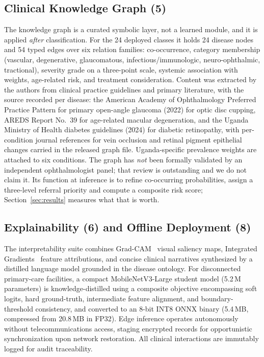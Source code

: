 \documentclass[11pt]{IEEEtran}
\begin{document}
\subsection{Clinical Knowledge Graph (5)}
\label{sec:kg}
The knowledge graph is a curated symbolic layer, not a learned module, and it is applied
\emph{after} classification. For the 24 deployed classes it holds 24 disease nodes and 54 typed
edges over six relation families: co-occurrence, category membership (vascular, degenerative,
glaucomatous, infectious/immunologic, neuro-ophthalmic, tractional), severity grade on a
three-point scale, systemic association with weights, age-related risk, and treatment
consideration. Content was extracted by the authors from clinical practice guidelines and primary
literature, with the source recorded per disease: the American Academy of Ophthalmology Preferred
Practice Pattern for primary open-angle glaucoma (2022) for optic disc cupping, AREDS Report
No.~39 for age-related macular degeneration, and the Uganda Ministry of Health diabetes
guidelines (2024) for diabetic retinopathy, with per-condition journal references for vein
occlusion and retinal pigment epithelial changes carried in the released graph file. Uganda-specific prevalence weights are
attached to six conditions. The graph has \emph{not} been formally validated by an independent
ophthalmologist panel; that review is outstanding and we do not claim it. Its function at
inference is to refine co-occurring probabilities, assign a three-level referral priority and
compute a composite risk score; Section~\ref{sec:results} measures what that is worth.

\subsection{Explainability (6) and Offline Deployment (8)}
The interpretability suite combines Grad-CAM~\cite{gradcam2017} visual saliency maps, Integrated
Gradients~\cite{ig2017} feature attributions, and concise clinical narratives synthesized by a distilled
language model grounded in the disease ontology. For disconnected primary-care facilities, a compact
MobileNetV3-Large student model (5.2\,M parameters) is knowledge-distilled using a composite objective
encompassing soft logits, hard ground-truth, intermediate feature alignment, and boundary-threshold consistency,
and converted to an 8-bit INT8 ONNX binary (5.4\,MB, compressed from 20.8\,MB in FP32). Edge inference
operates autonomously without telecommunications access, staging encrypted records for opportunistic synchronization
upon network restoration. All clinical interactions are immutably logged for audit traceability.
\end{document}
